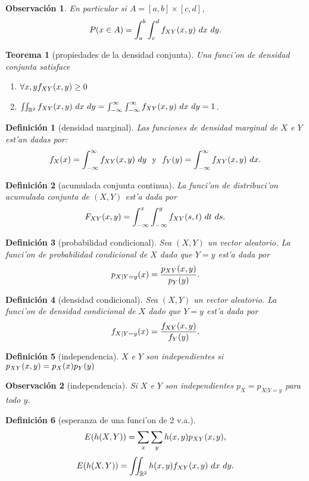 \documentclass[a4paper,spanish]{article}
\newcommand{\R}[0]{\mathbb{R}}
\newtheorem{teo}{Teorema}
\newtheorem{defi}{Definici\'on}
\newtheorem{obs}{Observaci\'on}
\begin{document}
\begin{obs} En particular si $A = [a,b] \times [c,d]$, 
$$P(x \in A) = \int_a^b \int_c^d \fxy(x,y)\ dx\ dy.$$
\end{obs}

\begin{teo}[propiedades de la densidad conjunta]
Una funci'on de densidad conjunta satisface
\begin{enumerate}
\item $\forall x,y f_{XY}(x,y) \geq 0$
\item $\iint_{\R^2} \fxy(x,y)\ dx\ dy = 
	\int_{-\infty}^\infty \int_{-\infty}^\infty \fxy(x,y)\ dx\ dy = 1$.
\end{enumerate}
\end{teo}

\begin{defi}[densidad marginal]
Las \emph{funciones de densidad marginal} de $X$ e $Y$ est'an dadas por:
$$f_X(x) = \int_{-\infty}^\infty f_{XY}(x,y)\ dy \mbox{\ \ y\ \ } 
	f_Y(y) = \int_{-\infty}^\infty f_{XY}(x,y)\ dx.$$
\end{defi}

\begin{defi}[acumulada conjunta continua] La \emph{funci'on de distribuci'on
acumulada conjunta} de $(X,Y)$ est'a dada por
$$F_{XY}(x,y) = \int_{-\infty}^x \int_{-\infty}^y f_{XY}(s,t)\ dt\ ds.$$
\end{defi}

\begin{defi}[probabilidad condicional] Sea $(X,Y)$ un vector aleatorio. La 
funci'on de probabilidad condicional de $X$ dado que $Y=y$ est'a dada por
$$p_{X|Y=y}(x) = \frac{p_{XY}(x,y)}{p_Y(y)}.$$
\end{defi}

\begin{defi}[densidad condicional] Sea $(X,Y)$ un vector aleatorio. La 
funci'on de densidad condicional de $X$ dado que $Y=y$ est'a dada por
$$f_{X|Y=y}(x) = \frac{f_{XY}(x,y)}{f_Y(y)}.$$
\end{defi}

\begin{defi}[independencia]
$X$ e $Y$ son independientes si $p_{XY}(x,y)=p_X(x)p_Y(y)$
\end{defi}

\begin{obs}[independencia] 
Si $X$ e $Y$ son independientes $p_X = p_{X|Y=y}$ para todo $y$.
\end{obs}

\begin{defi}[esperanza de una funci'on de 2 v.a.]
$$E(h(X,Y)) = \sum_x \sum_y h(x,y) p_{XY}(x,y),$$
$$E(h(X,Y)) = \iint_{\R^2} h(x,y) \fxy(x,y)\ dx\ dy.$$
\end{defi}
\end{document}
